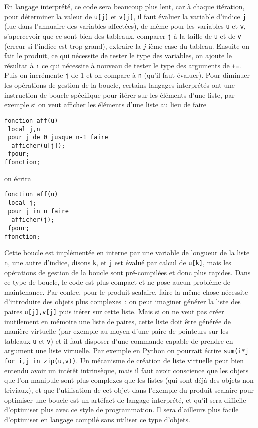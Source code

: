 \documentclass[12pt,a4paper]{book}
\begin{document}
\begin{giacjshere}
En langage interpr\'et\'e, ce code sera beaucoup plus lent, car \`a chaque 
it\'eration, pour d\'eterminer la valeur de \verb|u[j]| et \verb|v[j]|, 
il faut \'evaluer la variable d'indice \verb|j| (lue dans l'annuaire
des variables affect\'ees), de m\^eme pour les variables \verb|u|
et \verb|v|, s'apercevoir que ce sont bien des tableaux, comparer \verb|j|
\`a la taille de \verb|u| et de \verb|v| (erreur si l'indice est trop
grand), extraire la $j$-i\`eme case
du tableau. Ensuite on fait le produit, ce qui n\'ecessite de tester
le type des variables, on ajoute le r\'esultat \`a \verb|r| ce qui
n\'ecessite \`a nouveau de tester le type des arguments de \verb|+=|. 
Puis on incr\'emente \verb|j| de 1 et on compare \`a \verb|n| (qu'il
faut \'evaluer).
Pour diminuer les op\'erations de gestion de la boucle, 
certains langages interpr\'et\'es
ont une instruction de boucle sp\'ecifique pour it\'erer sur
les \'el\'ements d'une liste, par exemple si on veut afficher les
\'el\'ements d'une liste au lieu de faire
\begin{verbatim}
fonction aff(u)
 local j,n
 pour j de 0 jusque n-1 faire
  afficher(u[j]);
 fpour;
ffonction;
\end{verbatim}
on \'ecrira
\begin{verbatim}
fonction aff(u)
 local j;
 pour j in u faire
  afficher(j);
 fpour;
ffonction;
\end{verbatim}
Cette boucle est impl\'ement\'ee en interne par
une variable de longueur de la liste \verb|n|, une autre 
d'indice, disons \verb|k|,
et \verb|j| est \'evalu\'e par calcul de \verb|u[k]|, mais
les op\'erations de gestion de la boucle 
sont pr\'e-compil\'ees et donc plus rapides.
Dans ce type de boucle, le code est plus compact et ne pose aucun
probl\`eme de maintenance.
Par contre, pour le produit scalaire,
faire la m\^eme chose n\'ecessite d'introduire des objets plus
complexes~: on peut imaginer g\'en\'erer la liste des paires
\verb|u[j],v[j]|
puis it\'erer sur cette liste. Mais si on ne veut pas cr\'eer inutilement
en m\'emoire une liste de paires, cette liste doit \^etre g\'en\'er\'ee
de mani\`ere virtuelle (par exemple au moyen d'une paire de pointeurs
sur les tableaux \verb|u| et \verb|v|)
et il faut disposer d'une commande capable
de prendre en argument une liste virtuelle. Par exemple en Python 
on pourrait \'ecrire \verb|sum(i*j for i,j in zip(u,v))|. Un m\'ecanisme
de cr\'eation de liste virtuelle peut bien entendu avoir un int\'er\^et
intrins\`eque, mais il faut avoir conscience que les objets que
l'on manipule sont plus complexes que les listes (qui sont d\'ej\`a
des objets non triviaux), et que l'utilisation de cet objet dans l'exemple du
produit scalaire pour optimiser une boucle est un art\'efact
de langage interpr\'et\'e, et qu'il sera difficile d'optimiser plus avec
ce style de programmation. Il sera d'ailleurs plus facile d'optimiser
en langage compil\'e sans utiliser ce type d'objets.


\end{giacjshere}
\end{document}
